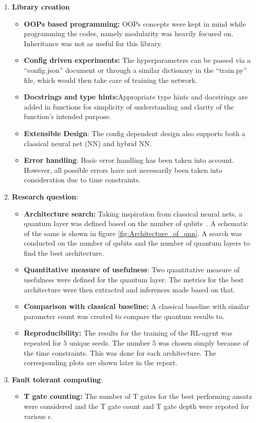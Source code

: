 \documentclass{article}
\begin{document}
\begin{enumerate}
    \item \textbf{Library creation} 
        \begin{itemize}
            \item \textbf{OOPs based programming:} OOPs concepts were kept in mind while programming the codes, namely modularity was heavily focused on. Inheritance was not as useful for this library. 
            \item \textbf{Config driven experiments:} The hyperparameters can be passed via a ``config.json'' document or through a similar dictionary in the ``train.py'' file, which would then take care of training the network.
            \item \textbf{Docstrings and type hints:}Appropriate type hints and docstrings are added in functions for simplicity of understanding and clarity of the function's intended purpose.
            \item \textbf{Extensible Design}: The config dependent design also supports both a classical neural net (NN) and hybrid NN.
            \item \textbf{Error handling}: Basic error handling has been taken into account. However, all possible errors have not necessarily been taken into consideration due to time constraints.
        \end{itemize}
    \item \textbf{Research question}:
        \begin{itemize}
            \item \textbf{Architecture search:} Taking inspiration from classical neural nets, a quantum layer was defined based on the number of qubits~\cite{lockwood2020:reinforcementlearningquantumvariational}. A schematic of the same is shown in figure \ref{fig:Architecture_of_qnn}. A search was conducted on the number of qubits and the number of quantum layers to find the best architecture.
            \item \textbf{Quantitative measure of usefulness}: Two quantitative measure of usefulness were defined for the quantum layer. The metrics for the best architecture were then extracted and inferences made based on that.
            \item \textbf{Comparison with classical baseline:} A classical baseline with similar parameter count was created to compare the quantum results to.  
            \item \textbf{Reproducibility:} The results for the training of the RL-agent was repeated for $5$ unique seeds. The number $5$ was chosen simply because of the time constraints. This was done for each architecture. The corresponding plots are shown later in the report. 
        \end{itemize}
    \item \textbf{Fault tolerant computing}:
        \begin{itemize}
            \item \textbf{T gate counting:} The number of T gates for the best performing ansatz were considered and the T gate count and T gate depth were repoted for various $\epsilon$.
        \end{itemize}
\end{enumerate}
\end{document}
